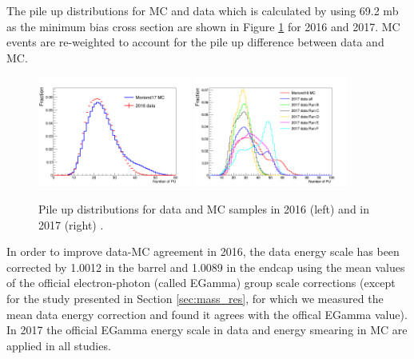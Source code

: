 The pile up distributions for MC and data which is calculated by using 69.2 mb as the minimum bias cross section are shown in Figure \ref{fig:Z_pileup} for 2016 and 2017. MC events are re-weighted to account for the pile up difference between data and MC.
\begin{figure}[h!]
  \centering
	\includegraphics[width=0.45\textwidth]{figures/Zprime/PU.png}
    \includegraphics[width=0.45\textwidth]{figures/Zprime/2017_PU.png}
\caption{Pile up distributions for data and MC samples in 2016 (left) and in 2017 (right) .
 \label{fig:Z_pileup}}
\end{figure}

In order to improve data-MC agreement in 2016, the data energy scale has been corrected by 1.0012 in the barrel and 1.0089 in the endcap using the mean values of the official electron-photon (called EGamma) group scale corrections (except for the study presented in Section \ref{sec:mass_res}, for which we measured the mean data energy correction and found it agrees with the offical EGamma value). In 2017 the official EGamma energy scale in data and energy smearing in MC are applied in all studies.


